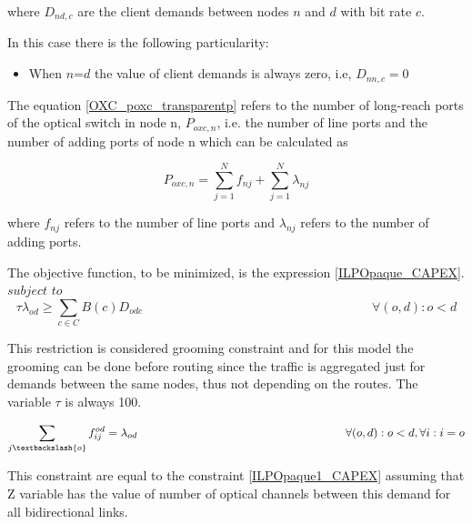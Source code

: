 \vspace{11pt}
where $D_{nd,c}$ are the client demands between nodes $n$ and $d$ with bit rate $c$.

\vspace{11pt}
In this case there is the following particularity:

\begin{itemize}
  \item When $n$=$d$ the value of client demands is always zero, i.e, $D_{nn,c}=0$
\end{itemize}

\vspace{11pt}
The equation \ref{OXC_poxc_transparentp} refers to the number of long-reach ports of the optical switch in node n, $P_{oxc,n}$, i.e. the number of line ports and the number of adding ports of node n which can be calculated as

\begin{equation}
P_{oxc,n} = \sum_{j=1}^{N} f_{nj} + \sum_{j=1}^{N} \lambda_{nj}
\label{OXC_poxc_transparentp}
\end{equation}

\vspace{11pt}
where $f_{nj}$ refers to the number of line ports and $\lambda_{nj}$ refers to the number of adding ports.

\vspace{17pt}
The objective function, to be minimized, is the expression \ref{ILPOpaque_CAPEX}.\\

$subject$ $to$
\begin{equation}
\tau \lambda_{od} \geq \sum_{c\in C} B\left(c\right) D_{odc} \qquad \qquad \qquad \qquad \qquad \qquad \qquad \qquad \qquad
\forall(o,d) : o < d
\label{ILPTransp0}
\end{equation}

This restriction is considered grooming constraint and for this model the grooming can be done before routing since the traffic is aggregated just for demands between the same nodes, thus not depending on the routes. The variable  $\tau$ is always 100.

\begin{equation}
\sum_{j\textbackslash \{o\}} f_{ij}^{od} = \lambda_{od}  \qquad \qquad \qquad \qquad \qquad \qquad \qquad \qquad \qquad
\forall(o,d) : o < d, \forall i: i = o
\label{ILPTransp1}
\end{equation}

This constraint are equal to the constraint \ref{ILPOpaque1_CAPEX} assuming that Z variable has the value of number of optical channels between this demand for all bidirectional links.

